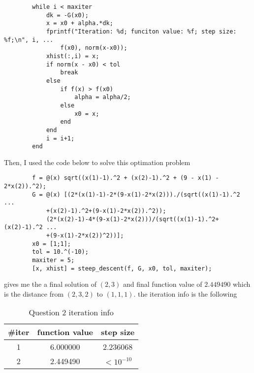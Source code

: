 \begin{answer}
\begin{verbatim}
        while i < maxiter
            dk = -G(x0);
            x = x0 + alpha.*dk;
            fprintf("Iteration: %d; funciton value: %f; step size: %f;\n", i, ...
                f(x0), norm(x-x0));
            xhist(:,i) = x;
            if norm(x - x0) < tol
                break
            else
                if f(x) > f(x0)
                    alpha = alpha/2;
                else
                    x0 = x;
                end
            end
            i = i+1;
        end
    \end{verbatim}
    Then, I used the code below to solve this optimation problem
    \begin{verbatim}
        f = @(x) sqrt((x(1)-1).^2 + (x(2)-1).^2 + (9 - x(1) - 2*x(2)).^2);
        G = @(x) [(2*(x(1)-1)-2*(9-x(1)-2*x(2)))./(sqrt((x(1)-1).^2 ...
            +(x(2)-1).^2+(9-x(1)-2*x(2)).^2));
            (2*(x(2)-1)-4*(9-x(1)-2*x(2)))/(sqrt((x(1)-1).^2+(x(2)-1).^2 ...
            +(9-x(1)-2*x(2))^2))];
        x0 = [1;1];
        tol = 10.^(-10);
        maxiter = 5;
        [x, xhist] = steep_descent(f, G, x0, tol, maxiter);
    \end{verbatim}
    \MATLAB gives me the a final solution of $(2,3)$ and final function value of $2.449490$ which is the distance from $(2,3,2)$ to $(1,1,1)$.
    the iteration info is the following
    \begin{table}[H]
    \centering
    \caption{Question 2 iteration info}
    \label{tab:tab1}
    \begin{tabular}{|c|c|c|}
    \hline
    \textbf{\#iter} & \textbf{function value} & \textbf{step size} \\ \hline
    1               & 6.000000                & 2.236068           \\ \hline
    2               & 2.449490                & $<10^{-10}$      \\ \hline
    \end{tabular}
    \end{table}
    
\end{answer}